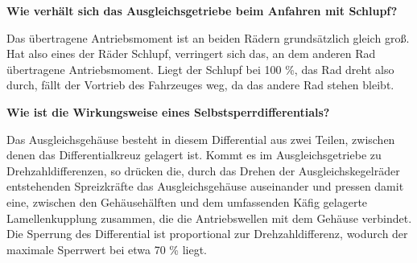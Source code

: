 \textbf{Wie verhält sich das Ausgleichsgetriebe beim Anfahren mit
Schlupf?}

Das übertragene Antriebsmoment ist an beiden Rädern grundsätzlich gleich
groß. Hat also eines der Räder Schlupf, verringert sich das, an dem
anderen Rad übertragene Antriebsmoment. Liegt der Schlupf bei 100 \%,
das Rad dreht also durch, fällt der Vortrieb des Fahrzeuges weg, da das
andere Rad stehen bleibt.

\textbf{Wie ist die Wirkungsweise eines Selbstsperrdifferentials?}

Das Ausgleichsgehäuse besteht in diesem Differential aus zwei Teilen,
zwischen denen das Differentialkreuz gelagert ist. Kommt es im
Ausgleichsgetriebe zu Drehzahldifferenzen, so drücken die, durch das
Drehen der Ausgleichskegelräder entstehenden Spreizkräfte das
Ausgleichsgehäuse auseinander und pressen damit eine, zwischen den
Gehäusehälften und dem umfassenden Käfig gelagerte Lamellenkupplung
zusammen, die die Antriebswellen mit dem Gehäuse verbindet. Die Sperrung
des Differential ist proportional zur Drehzahldifferenz, wodurch der
maximale Sperrwert bei etwa 70 \% liegt.
